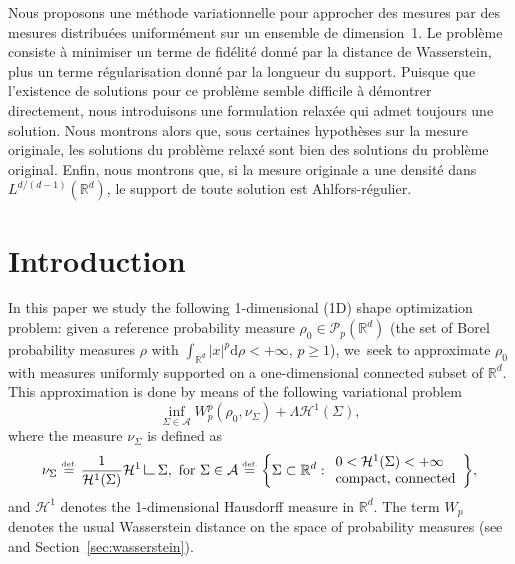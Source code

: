 \documentclass[JEP,XML,SOM,Unicode,NoFloatCountersInSection,published]{cedram}
\theoremstyle{definition}
\newcommand{\eqdef}{\ensuremath{\stackrel{\mbox{\upshape\tiny def.}}{=}}}
\newcommand\LM[1]{\hbox{\vrule width.5pt \vbox to#1pt{\vfill \hrule width#1pt height.5pt}}}
\newcommand\LL{{\mathchoice {\>\LM7\>}{\>\LM7\>}{\,\LM5\,}{\,\LM{3.35}\,}}}
\newcommand{\mres}{\LL}
\newcommand\cH{\mathcal{H}}
\newcommand{\RR}{\mathbb{R}}
\newcommand\dd{\mathrm{d}}
\begin{document}

\begin{altabstract}
Nous proposons une méthode variationnelle pour approcher des mesures par des mesures distribuées uniformément sur un ensemble de dimension~1. Le problème consiste à minimiser un terme de fidélité donné par la distance de Wasserstein, plus un terme régularisation donné par la longueur du support. Puisque que l'existence de solutions pour ce problème semble difficile à démontrer directement, nous introduisons une formulation relaxée qui admet toujours une solution. Nous montrons alors que, sous certaines hypothèses sur la mesure originale, les solutions du problème relaxé sont bien des solutions du problème original. Enfin, nous montrons que, si la mesure originale a une densité dans $L^{d/(d-1)}(\mathbb{R}^d)$, le support de toute solution est Ahlfors-régulier.
\end{altabstract}
\maketitle

\vspace*{-1.5\baselineskip}
\tableofcontents


\section{Introduction}\label{section.introduction}
In this paper we study the following 1-dimensional (1D) shape optimization
problem: given a reference probability measure
$\rho_0 \in \mathcal{P}_p(\RR^d)$ (the set of
Borel probability measures $\rho$ with $\int_{\RR^d}|x|^p \dd \rho<+\infty$, $p\ge 1$), we~seek to approximate $\rho_0$ with measures uniformly supported on a one-dimensional connected subset of $\RR^d$.
This approximation is done by means of the following variational problem
\begin{equation}
\label{problem.shape_optimization}
\tag{$P_\Lambda$}
\inf_{\Sigma \in \mathcal{A}}
W_p^p(\rho_0, \nu_{\Sigma}) + \Lambda \cH^1(\Sigma),
\end{equation}
where the measure $\nu_{\Sigma}$ is defined as
\begin{equation}\label{admissible_set}
\nu_{\Sigma} \eqdef \frac{1}{\cH^1(\Sigma)} \cH^1\mres \Sigma, \text{ for } \Sigma \in
\mathcal{A}\eqdef
\biggl\{
\Sigma \subset \RR^d :
\begin{array}{l}
0 < \mathcal{H}^1(\Sigma) < +\infty \\
\text{compact, connected}
\end{array}
\biggr\},
\end{equation}
and $\mathcal{H}^1$ denotes the 1-dimensional Hausdorff measure in $\RR^d$. The term $W_p$ denotes the usual Wasserstein distance on the space of probability measures (see~\cite{santambrogio2015optimal,villani2009optimal}
and Section~\ref{sec:wasserstein}).
\end{document}

